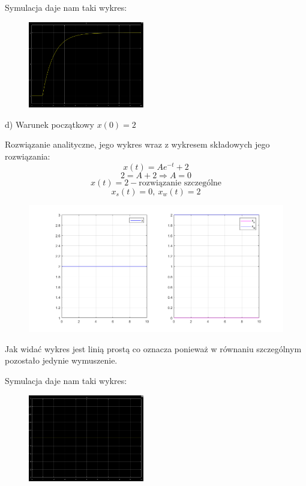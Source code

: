 \documentclass{article}
\begin{document}
\newpage 

Symulacja daje nam taki wykres:\\
\begin{figure}[h!]
    \centering
    \includegraphics[width=0.45\textwidth]{x_0_sym.png}
    \label{fig:my_label}
\end{figure}

\begin{flushleft}
d) Warunek początkowy $x(0)=2$\\
\end{flushleft}
Rozwiązanie analityczne, jego wykres wraz z wykresem składowych jego rozwiązania:\\
$$
x(t)=Ae^{-t}+2
$$
$$
2=A+2 \Rightarrow A=0
$$
$$
x(t)=2-\text{rozwiązanie szczególne}
$$
$$
x_s(t)=0, \  x_w(t)=2
$$

\begin{figure}[h!]
    \centering
    \includegraphics[width=\textwidth]{x_2.png}
    \label{fig:my_label}
\end{figure}
Jak widać wykres jest linią prostą co oznacza ponieważ w równaniu szczególnym pozostało jedynie wymuszenie.

\newpage

Symulacja daje nam taki wykres:\\
\begin{figure}[h!]
    \centering
    \includegraphics[width=0.45\textwidth]{x_2_sym.png}
    \label{fig:my_label}
\end{figure}
\end{document}
